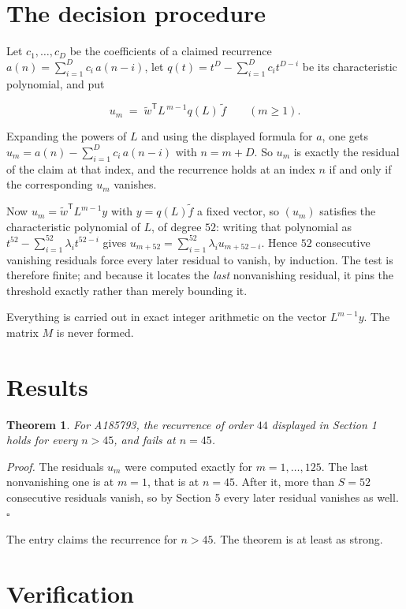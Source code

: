 \documentclass[11pt]{article}
\newtheorem{theorem}{Theorem}
\theoremstyle{definition}
\begin{document}
\section{The decision procedure}

Let $c_1,\dots,c_D$ be the coefficients of a claimed recurrence $a(n) = \sum_{i=1}^{D} c_i\,a(n-i)$, let $q(t) = t^{D} - \sum_{i=1}^{D} c_i t^{D-i}$ be its characteristic polynomial, and put

\[u_m \;=\; \tilde w^{\mathsf T} L^{\,m-1} q(L)\,\tilde f \qquad (m \ge 1).\]

Expanding the powers of $L$ and using the displayed formula for $a$, one gets $u_m = a(n) - \sum_{i=1}^{D} c_i\,a(n-i)$ with $n = m + D$. So $u_m$ is exactly the residual of the claim at that index, and the recurrence holds at an index $n$ if and only if the corresponding $u_m$ vanishes.

Now $u_m = \tilde w^{\mathsf T} L^{m-1} y$ with $y = q(L)\tilde f$ a fixed vector, so $(u_m)$ satisfies the characteristic polynomial of $L$, of degree $52$: writing that polynomial as $t^{52} - \sum_{i=1}^{52} \lambda_i t^{52-i}$ gives $u_{m+52} = \sum_{i=1}^{52} \lambda_i u_{m+52-i}$. Hence $52$ consecutive vanishing residuals force every later residual to vanish, by induction. The test is therefore finite; and because it locates the {\itshape last} nonvanishing residual, it pins the threshold exactly rather than merely bounding it.

Everything is carried out in exact integer arithmetic on the vector $L^{m-1}y$. The matrix $M$ is never formed.

\section{Results}

\begin{theorem} For A185793, the recurrence of order $44$ displayed in Section 1 holds for every $n > 45$, and fails at $n = 45$.\end{theorem}

{\itshape Proof.} The residuals $u_m$ were computed exactly for $m = 1,\dots,125$. The last nonvanishing one is at $m = 1$, that is at $n = 45$. After it, more than $S = 52$ consecutive residuals vanish, so by Section 5 every later residual vanishes as well. $\square$

The entry claims the recurrence for $n > 45$. The theorem is at least as strong.

\section{Verification}
\end{document}
